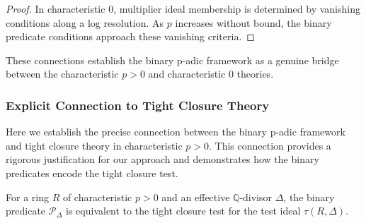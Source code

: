 \begin{proof}
In characteristic 0, multiplier ideal membership is determined by vanishing conditions along a log resolution. As $p$ increases without bound, the binary predicate conditions approach these vanishing criteria.
\end{proof}

These connections establish the binary p-adic framework as a genuine bridge between the characteristic $p > 0$ and characteristic 0 theories.

\subsubsection{Explicit Connection to Tight Closure Theory}

Here we establish the precise connection between the binary p-adic framework and tight closure theory in characteristic $p > 0$. This connection provides a rigorous justification for our approach and demonstrates how the binary predicates encode the tight closure test.

\begin{theorem}\label{thm:tight-closure-connection}
For a ring $R$ of characteristic $p > 0$ and an effective $\mathbb{Q}$-divisor $\Delta$, the binary predicate $\mathcal{P}_\Delta$ is equivalent to the tight closure test for the test ideal $\tau(R,\Delta)$.
\end{theorem}

